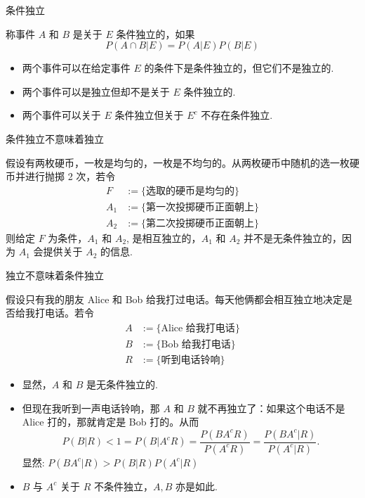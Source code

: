 \begin{frame}{条件独立}
\begin{defi}
称事件 $A$ 和 $B$ 是关于 $E$ 条件独立的，如果 $$P (A\cap B|E)=P (A|E) P (B|E)$$
\end{defi}
\pause
\begin{itemize}[<+-|alert@+>]
\item 两个事件可以在给定事件 $E$ 的条件下是条件独立的，但它们不是独立的.
\item 两个事件可以是独立但却不是关于 $E$ 条件独立的.
\item 两个事件可以关于 $E$ 条件独立但关于 $E^c$ 不存在条件独立.
\end{itemize}
\end{frame}

\begin{frame}{条件独立不意味着独立}
\begin{exam}
假设有两枚硬币，一枚是均匀的，一枚是不均匀的。从两枚硬币中随机的选一枚硬币并进行抛掷 2 次，若令
\begin{align*}
  F &:=\{\mbox{选取的硬币是均匀的}\}\\
   A_{1}&:= \{\mbox{第一次投掷硬币正面朝上}\}\\
   A_{2}&:= \{\mbox{第二次投掷硬币正面朝上}\}
\end{align*}
则给定 $F$ 为条件，$A_1$ 和 $A_2$, 是相互独立的，$A_1$ 和 $A_2$ 并不是无条件独立的，因为 $A_1$ 会提供关于 $A_2$ 的信息.
\end{exam}
\end{frame}

\begin{frame}{独立不意味着条件独立}
\begin{exam}
假设只有我的朋友 Alice 和 Bob 给我打过电话。每天他俩都会相互独立地决定是否给我打电话。若令
\begin{align*}
	 A&:= \{\mbox{Alice 给我打电话}\}\\
	 B&:= \{\mbox{Bob 给我打电话}\}\\
     R&:=\{\mbox{听到电话铃响}\}
  \end{align*}
  \pause
  \begin{itemize}[<+-|alert@+>]
  \item 显然，$A$ 和 $B$ 是无条件独立的.
  \item 但现在我听到一声电话铃响，那 $A$ 和 $B$ 就不再独立了：如果这个电话不是 Alice 打的，那就肯定是 Bob 打的。从而 \pause
  $$P(B|R)<1=P(B|A^cR)= \frac{P(BA^cR)}{P(A^cR)}= \frac{P(BA^c|R)}{P(A^c|R)}.$$
  显然: $P (BA^c|R)>P (B|R) P (A^c|R)$
  \item $B$ 与 $A^c$ 关于 $R$ 不条件独立，$A,B$ 亦是如此.
  \end{itemize}

\end{exam}
\end{frame}

